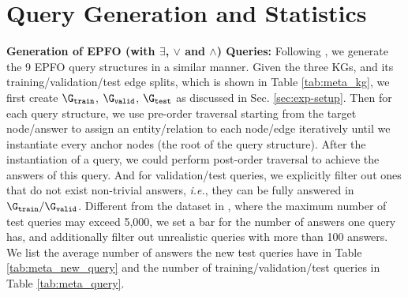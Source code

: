 \section{Query Generation and Statistics}\label{sec:query_generation}
\textbf{Generation of EPFO (with $\exists$, $\vee$ and $\wedge$) Queries:} Following \cite{ren2020query2box}, we generate the 9 EPFO query structures in a similar manner. Given the three KGs, and its training/validation/test edge splits, which is shown in Table \ref{tab:meta_kg}, we first create $\G_\texttt{train}$, $\G_\texttt{valid}$, $\G_\texttt{test}$ as discussed in Sec. \ref{sec:exp-setup}. Then for each query structure, we use pre-order traversal starting from the target node/answer to assign an entity/relation to each node/edge iteratively until we instantiate every anchor nodes (the root of the query structure). After the instantiation of a query, we could perform post-order traversal to achieve the answers of this query. And for validation/test queries, we explicitly filter out ones that do not exist non-trivial answers, \textit{i.e.}, they can be fully answered in $\G_\texttt{train} / \G_\texttt{valid}$. Different from the dataset in \cite{ren2020query2box}, where the maximum number of test queries may exceed 5,000, we set a bar for the number of answers one query has, and additionally filter out unrealistic queries with more than 100 answers. We list the average number of answers the new test queries have in Table \ref{tab:meta_new_query} and the number of training/validation/test queries in Table \ref{tab:meta_query}.

\begin{table*}[!h]
\centering
\small
{}
\caption{Knowledge graph dataset statistics as well as training, validation and test edge splits.}
\label{tab:meta_kg}
\end{table*}

